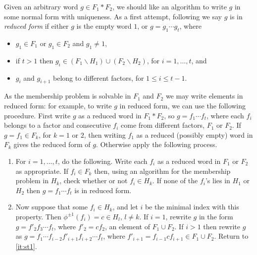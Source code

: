 \documentclass[a4paper,12pt]{article}
\numberwithin{equation}{section}
\numberwithin{figure}{section}
\newcommand{\be}{\begin{enumerate}}
\newcommand{\ee}{\end{enumerate}}
\begin{document}
Given an arbitrary word $g\in F_1\ast F_2$,
we should like an algorithm to write $g$ in
some normal form with uniqueness. As a first attempt, following \cite{LS}  
 we say $g$ is in \emph{reduced form} if either $g$ is the empty word $1$, or
$g = g_1 \cdots g_t$, where
\begin{itemize}
\item
$g_1 \in F_1$ or $g_1 \in F_2$ and $g_1\neq 1$,  
\item
if 
$t > 1$ then   $g_i \in (F_1 \backslash H_1)\cup (F_2\backslash H_2)$,
for $i=1,\ldots ,t$, and
\item    $g_i$
and  ${g_{i+1}}$ belong to  different factors, for $1\le i\le t-1$.
\end{itemize}
As the membership problem
is solvable in $F_1$ and $F_2$ we may write elements in reduced form: for example,
to write $g$ in reduced form,
we can use the following procedure.
First write $g$  as a reduced word in $F_1\ast F_2$, so $g=f_1\cdots f_t$, where
each $f_i$ belongs to a factor and
consecutive $f_i$ come from different factors, $F_1$ or $F_2$. 
If $g=f_1\in F_k$, for $k=1$ or $2$, then writing $f_1$ as a 
reduced (possibly empty) word in $F_k$ gives the  reduced form of $g$. 
Otherwise
 apply the
following process.
\be[Step 1]
\item\label{it:st1} For $i=1,\ldots ,t$, do the following.
Write each $f_i$ as  a reduced word in $F_1$ or $F_2$ as appropriate.
If $f_i\in F_k$ then,
using an algorithm for the membership problem in $H_k$, check whether or not
$f_i \in H_k$.
 If none of the $f_i$'s lies in $H_1$ or $H_2$ then
$g= f_1 \cdots f_t$ is in  reduced form.
\item  Now suppose that some $f_i \in H_k$,  and let  $i$ be the
minimal index with this property. Then $\phi^{\pm 1}(f_i)=c\in H_{l}$, $l\neq k$.
If $i = 1$, rewrite $g$  in the
form $g = f'_2 f_3 \cdots f_t$,  where  $f'_2 = cf_2$, an element of $F_1\cup F_2$.
If $i > 1$ then rewrite $g$ as
$g = f_1 \cdots f_{i-2} f'_{i+1}f_{i+2} \cdots f_t$, where
$f'_{i+1} = f_{i-1}c f_{i+1}\in F_1\cup F_2$. Return to
\ref{it:st1}.
\ee
\end{document}
